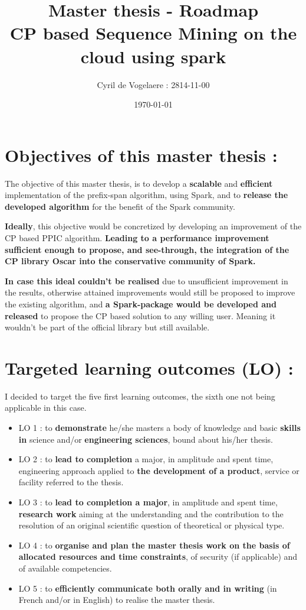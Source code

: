 \documentclass[10pt]{article}
\title{Master thesis - Roadmap\\%
CP based Sequence Mining on the cloud using spark}
\author{Cyril de Vogelaere : 2814-11-00}
\date{\today}
\begin{document}
\maketitle

\section{Objectives of this master thesis : }

The objective of this master thesis, is to develop a \textbf{scalable} and \textbf{efficient} implementation
of the prefix-span algorithm, using Spark, and to \textbf{release the developed algorithm} for the benefit of the Spark community. \newline

\textbf{Ideally}, this objective would be concretized by developing an improvement of the CP based PPIC algorithm. \textbf{Leading to a performance improvement sufficient enough to propose, and see-through, the integration of the CP library Oscar into the conservative community of Spark.}
\newline

\textbf{In case this ideal couldn't be realised} due to unsufficient improvement in the results, otherwise attained improvements would still be proposed to improve the existing algorithm,
and \textbf{a Spark-package would be developed and released} to propose the CP based solution to any willing user. Meaning it wouldn't be part of the official library but still available.

\section{Targeted learning outcomes (LO) :}

I decided to target the five first learning outcomes, the sixth one not being applicable in this case.

\begin{itemize}
\item LO 1 : to \textbf{demonstrate} he/she masters a body of knowledge and basic
\textbf{skills in} science and/or \textbf{engineering sciences}, bound about his/her
thesis.
\item LO 2 : to \textbf{lead to completion} a major, in amplitude and spent time,
engineering approach applied to \textbf{the development of a product},
service or facility referred to the thesis.
\item LO 3 : to \textbf{lead to completion a major}, in amplitude and spent time,
\textbf{research work} aiming at the understanding and the contribution
to the resolution of an original scientific question of theoretical
or physical type.
\item LO 4 : to \textbf{organise and plan the master thesis work on the basis of
allocated resources and time constraints}, of security (if applicable)
and of available competencies.
\item LO 5 : to \textbf{efficiently communicate both orally and in writing} (in French
and/or in English) to realise the master thesis.
\end{itemize}
\end{document}
